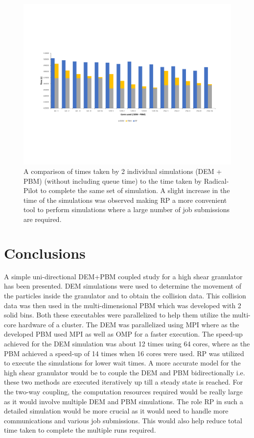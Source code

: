 \documentclass[preprint,11pt,authoryear]{elsarticle}
\begin{document}
\begin{figure}
\centering
\includegraphics[scale=0.7]{rslts_RP_timeComparison.pdf}
\caption{A comparison of times taken by 2 individual simulations (DEM + PBM) (without 
including queue time) to the  time taken by Radical-Pilot to complete the same set of simulation. 
A slight increase in the time of the simulations was observed making RP a more convenient 
tool to perform simulations where a large number of job submissions are required.}
\label{fig:rslts_RP_time_plot}
\end{figure}
	    
\section{Conclusions}
 A simple uni-directional DEM+PBM coupled study for a high shear granulator has been presented. DEM simulations were 
used to determine the movement of the particles inside the granulator and to obtain the collision data. This collision data 
was then used in the multi-dimensional PBM which was developed with 2 solid bins. Both these executables were parallelized 
to help them utilize the multi-core hardware of a cluster. The DEM was parallelized using MPI where as the developed PBM used 
MPI as well as OMP for a faster execution. The speed-up achieved for the DEM simulation was about 12 times using 64 cores, 
where as the PBM achieved a speed-up of 14 times when 16 cores were used. RP was utilized to execute the simulations for lower 
wait times.
 A more accurate model for the high shear granulator would be to couple the DEM and PBM bidirectionally i.e. these 
two methods are executed iteratively up till a steady state is reached. For the two-way coupling, the computation resources 
required would be really large as it would involve multiple DEM and PBM simulations. The role RP in such a detailed simulation
would be more crucial as it would need to handle more communications and various job submissions. This would also help reduce 
total time taken to complete the multiple runs required. 
\end{document}
